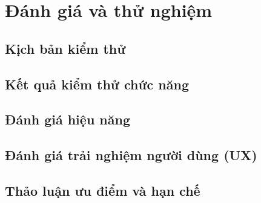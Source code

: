\chapter{Đánh giá và thử nghiệm}
\label{chap:danhgia}


\section{Kịch bản kiểm thử}
\label{sec:kichbankiemthu}

\section{Kết quả kiểm thử chức năng}
\label{sec:ketquachucnang}

\section{Đánh giá hiệu năng}
\label{sec:danhgiahieunang}

\section{Đánh giá trải nghiệm người dùng (UX)}
\label{sec:danhgiaux}

\section{Thảo luận ưu điểm và hạn chế}
\label{sec:thaoluan}
